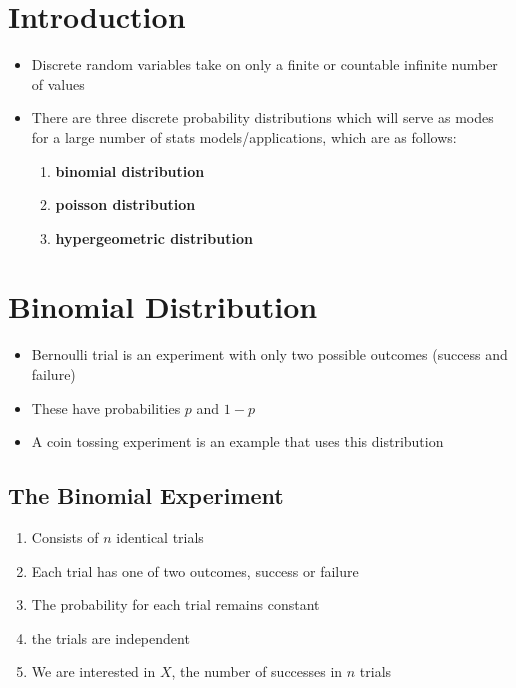 \section{Introduction}

\begin{itemize}
    \item Discrete random variables take on only a finite or countable infinite number of values
    \item There are three discrete probability distributions which will serve as modes for a large number of stats models/applications, which are as follows:
    \begin{enumerate}
        \item \bf{binomial} distribution
        \item \bf{poisson} distribution
        \item \bf{hypergeometric} distribution
    \end{enumerate}
\end{itemize}

\section{Binomial Distribution}

\begin{itemize}
    \item Bernoulli trial is an experiment with only two possible outcomes (success and failure)
    \item These have probabilities $p$ and $1-p$
    \item A coin tossing experiment is an example that uses this distribution 
\end{itemize}

\subsection{The Binomial Experiment}

\begin{enumerate}
    \item Consists of $n$ identical trials
    \item Each trial has one of two outcomes, success or failure
    \item The probability for each trial remains constant
    \item the trials are independent
    \item We are interested in $X$, the number of successes in $n$ trials
\end{enumerate}\newpage

